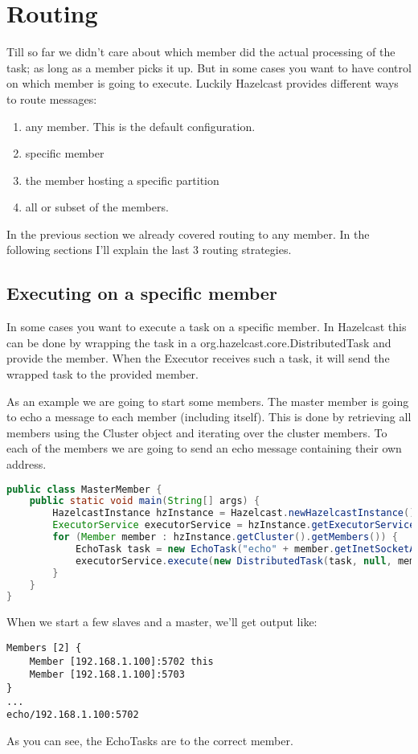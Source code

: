 \section{Routing}
Till so far we didn't care about which member did the actual processing of the task; as long as a member picks it up. But in some cases you want to have control on which member is going to execute. Luckily Hazelcast provides different ways to route messages:
\begin{enumerate}
\item any member. This is the default configuration.
\item specific member
\item the member hosting a specific partition
\item all or subset of the members.
\end{enumerate}
In the previous section we already covered routing to any member. In the following sections I'll explain the last 3 routing strategies.

\subsection{Executing on a specific member}
In some cases you want to execute a task on a specific member. In Hazelcast this can be done by wrapping the task in a org.hazelcast.core.DistributedTask and provide the member. When the Executor receives such a task, it will send the wrapped task to the provided member.

As an example we are going to start some members. The master member is going to echo a message to each member (including itself). This is done by retrieving all members using the Cluster object and iterating over the cluster members. To each of the members we are going to send an echo message containing their own address. 
\begin{lstlisting}[language=java]
public class MasterMember {
    public static void main(String[] args) {
        HazelcastInstance hzInstance = Hazelcast.newHazelcastInstance();
        ExecutorService executorService = hzInstance.getExecutorService("executor");
        for (Member member : hzInstance.getCluster().getMembers()) {
            EchoTask task = new EchoTask("echo" + member.getInetSocketAddress());
            executorService.execute(new DistributedTask(task, null, member));
        }
    }
}
\end{lstlisting}
When we start a few slaves and a master, we'll get output like:
\begin{lstlisting}
Members [2] {
	Member [192.168.1.100]:5702 this
	Member [192.168.1.100]:5703
}
...
echo/192.168.1.100:5702
\end{lstlisting}
As you can see, the EchoTasks are to the correct member.

